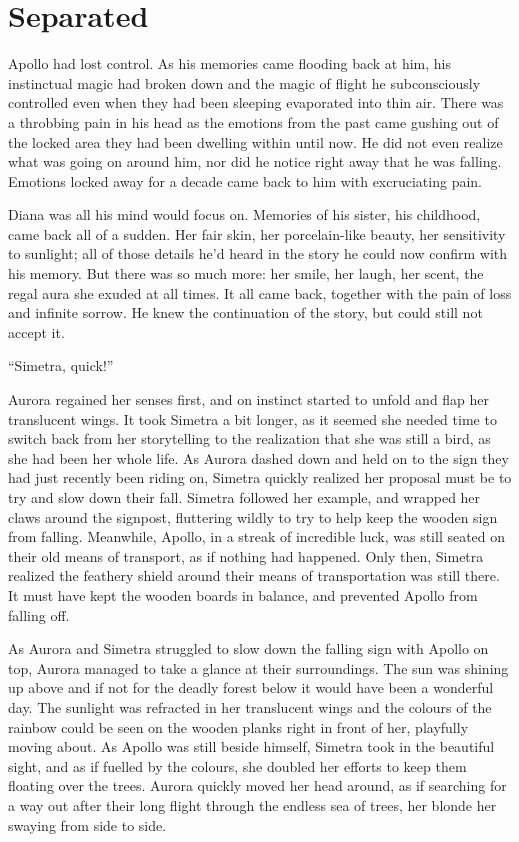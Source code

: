 \chapter{Separated}
\label{cha:separated}
Apollo had lost control. As his memories came flooding back at him, his instinctual magic had broken down and the magic of flight he subconsciously controlled even when they had been sleeping evaporated into thin air. There was a throbbing pain in his head as the emotions from the past came gushing out of the locked area they had been dwelling within until now. He did not even realize what was going on around him, nor did he notice right away that he was falling. Emotions locked away for a decade came back to him with excruciating pain.

Diana was all his mind would focus on. Memories of his sister, his childhood, came back all of a sudden. Her fair skin, her porcelain-like beauty, her sensitivity to sunlight; all of those details he'd heard in the story he could now confirm with his memory. But there was so much more: her smile, her laugh, her scent, the regal aura she exuded at all times. It all came back, together with the pain of loss and infinite sorrow. He knew the continuation of the story, but could still not accept it.

\froufrou{}

\enquote{Simetra, quick!}

Aurora regained her senses first, and on instinct started to unfold and flap her translucent wings. It took Simetra a bit longer, as it seemed she needed time to switch back from her storytelling to the realization that she was still a bird, as she had been her whole life. As Aurora dashed down and held on to the sign they had just recently been riding on, Simetra quickly realized her proposal must be to try and slow down their fall. Simetra followed her example, and wrapped her claws around the signpost, fluttering wildly to try to help keep the wooden sign from falling. Meanwhile, Apollo, in a streak of incredible luck, was still seated on their old means of transport, as if nothing had happened. Only then, Simetra realized the feathery shield around their means of transportation was still there. It must have kept the wooden boards in balance, and prevented Apollo from falling off.

As Aurora and Simetra struggled to slow down the falling sign with Apollo on top, Aurora managed to take a glance at their surroundings. The sun was shining up above and if not for the deadly forest below it would have been a wonderful day. The sunlight was refracted in her translucent wings and the colours of the rainbow could be seen on the wooden planks right in front of her, playfully moving about. As Apollo was still beside himself, Simetra took in the beautiful sight, and as if fuelled by the colours, she doubled her efforts to keep them floating over the trees. Aurora quickly moved her head around, as if searching for a way out after their long flight through the endless sea of trees, her blonde her swaying from side to side.

